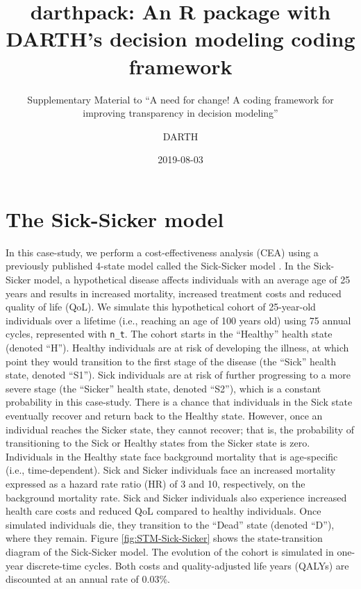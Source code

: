 \documentclass[]{book}
\title{darthpack: An R package with DARTH's decision modeling coding framework}
\subtitle{Supplementary Material to ``A need for change! A coding framework for
improving transparency in decision modeling''}
\author{DARTH}
\date{2019-08-03}
\begin{document}
\maketitle

{
\setcounter{tocdepth}{1}
\tableofcontents
}
\chapter*{The Sick-Sicker model}\label{the-sick-sicker-model}

In this case-study, we perform a cost-effectiveness analysis (CEA) using
a previously published 4-state model called the Sick-Sicker model
\citep{Enns2015}. In the Sick-Sicker model, a hypothetical disease
affects individuals with an average age of 25 years and results in
increased mortality, increased treatment costs and reduced quality of
life (QoL). We simulate this hypothetical cohort of 25-year-old
individuals over a lifetime (i.e., reaching an age of 100 years old)
using 75 annual cycles, represented with \texttt{n\_t}. The cohort
starts in the ``Healthy'' health state (denoted ``H''). Healthy
individuals are at risk of developing the illness, at which point they
would transition to the first stage of the disease (the ``Sick'' health
state, denoted ``S1''). Sick individuals are at risk of further
progressing to a more severe stage (the ``Sicker'' health state, denoted
``S2''), which is a constant probability in this case-study. There is a
chance that individuals in the Sick state eventually recover and return
back to the Healthy state. However, once an individual reaches the
Sicker state, they cannot recover; that is, the probability of
transitioning to the Sick or Healthy states from the Sicker state is
zero. Individuals in the Healthy state face background mortality that is
age-specific (i.e., time-dependent). Sick and Sicker individuals face an
increased mortality expressed as a hazard rate ratio (HR) of 3 and 10,
respectively, on the background mortality rate. Sick and Sicker
individuals also experience increased health care costs and reduced QoL
compared to healthy individuals. Once simulated individuals die, they
transition to the ``Dead'' state (denoted ``D''), where they remain.
Figure \ref{fig:STM-Sick-Sicker} shows the state-transition diagram of
the Sick-Sicker model. The evolution of the cohort is simulated in
one-year discrete-time cycles. Both costs and quality-adjusted life
years (QALYs) are discounted at an annual rate of 0.03\%.
\end{document}
